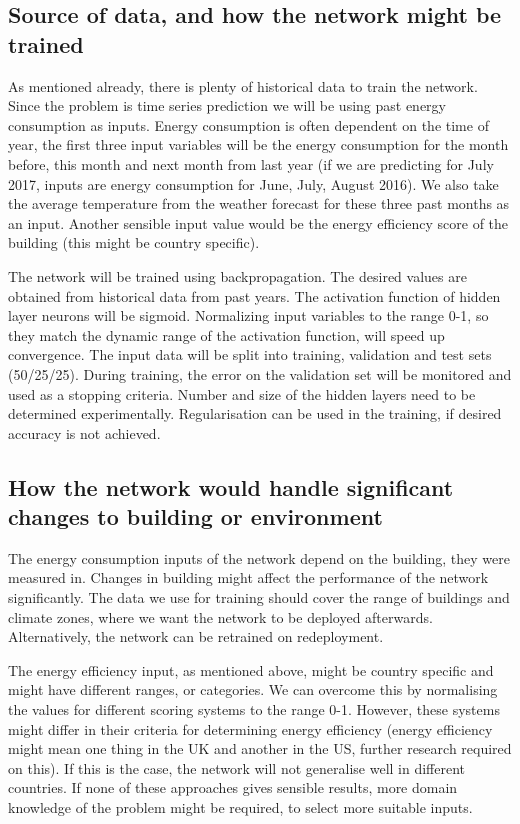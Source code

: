 \documentclass[a4paper, 11pt]{article}
\begin{document}
\subsection{Source of data, and how the network might be trained}
As mentioned already, there is plenty of historical data to train the network. Since the problem is time series prediction we will be using past energy consumption as inputs. Energy consumption is often dependent on the time of year, the first three input variables will be the energy consumption for the month before, this month and next month from last year (if we are predicting for July 2017, inputs are energy consumption for June, July, August 2016). We also take the average temperature from the weather forecast for these three past months as an input. Another sensible input value would be the energy efficiency score of the building (this might be country specific).

The network will be trained using backpropagation. The desired values are obtained from historical data from past years. The activation function of hidden layer neurons will be sigmoid. Normalizing input variables to the range 0-1, so they match the dynamic range of the activation function, will speed up convergence. The input data will be split into training, validation and test sets (50/25/25). During training, the error on the validation set will be monitored and used as a stopping criteria. Number and size of the hidden layers need to be determined experimentally. Regularisation can be used in the training, if desired accuracy is not achieved.

\subsection{How the network would handle significant changes to building or environment}
The energy consumption inputs of the network depend on the building, they were measured in. Changes in building might affect the performance of the network significantly. The data we use for training should cover the range of buildings and climate zones, where we want the network to be deployed afterwards. Alternatively, the network can be retrained on redeployment. 

The energy efficiency input, as mentioned above, might be country specific and might have different ranges, or categories. We can overcome this by normalising the values for different scoring systems to the range 0-1. However, these systems might differ in their criteria for determining energy efficiency (energy efficiency might mean one thing in the UK and another in the US, further research required on this). If this is the case, the network will not generalise well in different countries. If none of these approaches gives sensible results, more domain knowledge of the problem might be required, to select more suitable inputs. 
\end{document}
